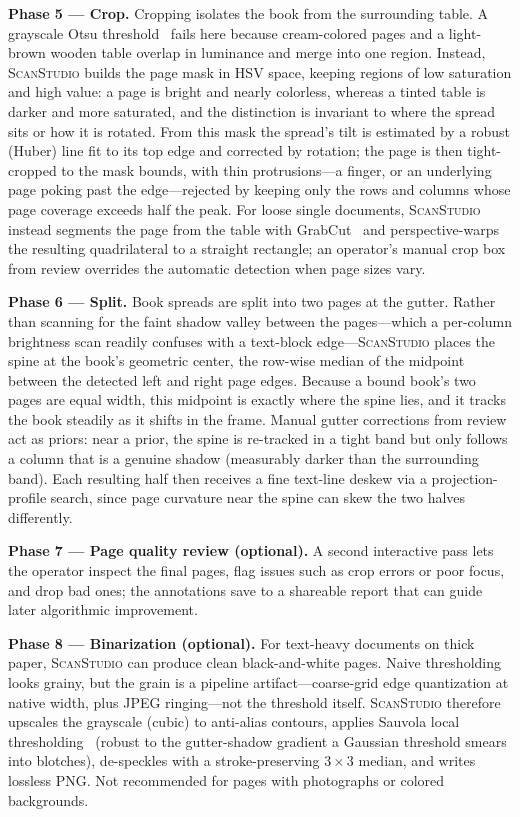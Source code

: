 \documentclass{article}
\newcommand{\sys}{\textsc{ScanStudio}\xspace}
\begin{document}
\noindent\textbf{Phase 5 --- Crop.}
Cropping isolates the book from the surrounding table. A grayscale Otsu
threshold~\cite{otsu1979threshold} fails here because cream-colored pages and a
light-brown wooden table overlap in luminance and merge into one region.
Instead, \sys builds the page mask in HSV space, keeping regions of low
saturation and high value: a page is bright and nearly colorless, whereas a
tinted table is darker and more saturated, and the distinction is invariant to
where the spread sits or how it is rotated. From this mask the spread's tilt is
estimated by a robust (Huber) line fit to its top edge and corrected by
rotation; the page is then tight-cropped to the mask bounds, with thin
protrusions---a finger, or an underlying page poking past the edge---rejected by
keeping only the rows and columns whose page coverage exceeds half the peak. For
loose single documents, \sys instead segments the page from the table with
GrabCut~\cite{rother2004grabcut} and perspective-warps the resulting
quadrilateral to a straight rectangle; an operator's manual crop box from review
overrides the automatic detection when page sizes vary.

\noindent\textbf{Phase 6 --- Split.}
Book spreads are split into two pages at the gutter. Rather than scanning for the
faint shadow valley between the pages---which a per-column brightness scan
readily confuses with a text-block edge---\sys places the spine at the book's
geometric center, the row-wise median of the midpoint between the detected left
and right page edges. Because a bound book's two pages are equal width, this
midpoint is exactly where the spine lies, and it tracks the book steadily as it
shifts in the frame. Manual gutter corrections from review act as priors: near a
prior, the spine is re-tracked in a tight band but only follows a column that is
a genuine shadow (measurably darker than the surrounding band). Each resulting
half then receives a fine text-line deskew via a projection-profile search, since
page curvature near the spine can skew the two halves differently.

\noindent\textbf{Phase 7 --- Page quality review (optional).}
A second interactive pass lets the operator inspect the final pages, flag issues
such as crop errors or poor focus, and drop bad ones; the annotations save to a
shareable report that can guide later algorithmic improvement.

\noindent\textbf{Phase 8 --- Binarization (optional).}
For text-heavy documents on thick paper, \sys can produce clean black-and-white
pages. Naive thresholding looks grainy, but the grain is a pipeline
artifact---coarse-grid edge quantization at native width, plus JPEG ringing---not
the threshold itself. \sys therefore upscales the grayscale (cubic) to anti-alias
contours, applies Sauvola local thresholding~\cite{sauvola2000adaptive} (robust to
the gutter-shadow gradient a Gaussian threshold smears into blotches), de-speckles
with a stroke-preserving $3\times3$ median, and writes lossless PNG. Not
recommended for pages with photographs or colored backgrounds.
\end{document}
